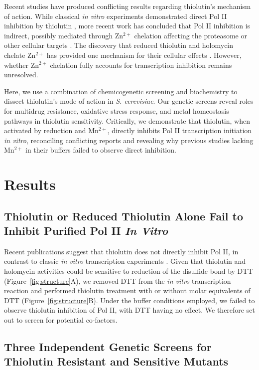 \documentclass[11pt]{article}
\begin{document}
Recent studies have produced conflicting results regarding thiolutin's mechanism of action. While classical \textit{in vitro} experiments demonstrated direct Pol II inhibition by thiolutin \citep{Tipper1973}, more recent work has concluded that Pol II inhibition is indirect, possibly mediated through Zn$^{2+}$ chelation affecting the proteasome or other cellular targets \citep{Lauber2021,Chan2017}. The discovery that reduced thiolutin and holomycin chelate Zn$^{2+}$ has provided one mechanism for their cellular effects \citep{Chan2017,Lauber2021}. However, whether Zn$^{2+}$ chelation fully accounts for transcription inhibition remains unresolved.

Here, we use a combination of chemicogenetic screening and biochemistry to dissect thiolutin's mode of action in \textit{S. cerevisiae}. Our genetic screens reveal roles for multidrug resistance, oxidative stress response, and metal homeostasis pathways in thiolutin sensitivity. Critically, we demonstrate that thiolutin, when activated by reduction and Mn$^{2+}$, directly inhibits Pol II transcription initiation \textit{in vitro}, reconciling conflicting reports and revealing why previous studies lacking Mn$^{2+}$ in their buffers failed to observe direct inhibition.

\section{Results}

\subsection{Thiolutin or Reduced Thiolutin Alone Fail to Inhibit Purified Pol II \textit{In Vitro}}

Recent publications suggest that thiolutin does not directly inhibit Pol II, in contrast to classic \textit{in vitro} transcription experiments \citep{Tipper1973}. Given that thiolutin and holomycin activities could be sensitive to reduction of the disulfide bond by DTT \citep{Tipper1973,Chan2017,Lauber2021} (Figure~\ref{fig:structure}A), we removed DTT from the \textit{in vitro} transcription reaction and performed thiolutin treatment with or without molar equivalents of DTT (Figure~\ref{fig:structure}B). Under the buffer conditions employed, we failed to observe thiolutin inhibition of Pol II, with DTT having no effect. We therefore set out to screen for potential co-factors.

\subsection{Three Independent Genetic Screens for Thiolutin Resistant and Sensitive Mutants}
\end{document}
